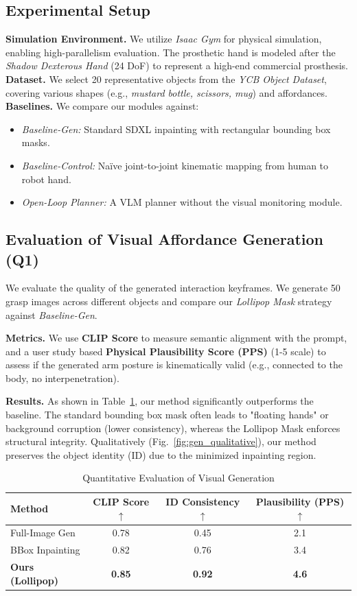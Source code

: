 \documentclass[letterpaper, 10 pt, conference]{ieeeconf}  %
\begin{document}
\subsection{Experimental Setup}
\textbf{Simulation Environment.} We utilize \textit{Isaac Gym} for physical simulation, enabling high-parallelism evaluation. The prosthetic hand is modeled after the \textit{Shadow Dexterous Hand} (24 DoF) to represent a high-end commercial prosthesis.
\textbf{Dataset.} We select 20 representative objects from the \textit{YCB Object Dataset}, covering various shapes (e.g., \textit{mustard bottle, scissors, mug}) and affordances.
\textbf{Baselines.} We compare our modules against:
\begin{itemize}
    \item \textit{Baseline-Gen:} Standard SDXL inpainting with rectangular bounding box masks.
    \item \textit{Baseline-Control:} Naïve joint-to-joint kinematic mapping from human to robot hand.
    \item \textit{Open-Loop Planner:} A VLM planner without the visual monitoring module.
\end{itemize}

\subsection{Evaluation of Visual Affordance Generation (Q1)}
\label{subsec:exp_generation}
We evaluate the quality of the generated interaction keyframes. We generate 50 grasp images across different objects and compare our \textit{Lollipop Mask} strategy against \textit{Baseline-Gen}.

\textbf{Metrics.} We use \textbf{CLIP Score} to measure semantic alignment with the prompt, and a user study based \textbf{Physical Plausibility Score (PPS)} (1-5 scale) to assess if the generated arm posture is kinematically valid (e.g., connected to the body, no interpenetration).

\textbf{Results.} As shown in Table~\ref{tab:gen_results}, our method significantly outperforms the baseline. The standard bounding box mask often leads to "floating hands" or background corruption (lower consistency), whereas the Lollipop Mask enforces structural integrity. Qualitatively (Fig.~\ref{fig:gen_qualitative}), our method preserves the object identity (ID) due to the minimized inpainting region.

\begin{table}[h]
\caption{Quantitative Evaluation of Visual Generation}
\label{tab:gen_results}
\centering
\begin{tabular}{lccc}
\hline
Method & CLIP Score $\uparrow$ & ID Consistency $\uparrow$ & Plausibility (PPS) $\uparrow$ \\
\hline
Full-Image Gen & 0.78 & 0.45 & 2.1 \\
BBox Inpainting & 0.82 & 0.76 & 3.4 \\
\textbf{Ours (Lollipop)} & \textbf{0.85} & \textbf{0.92} & \textbf{4.6} \\
\hline
\end{tabular}
\end{table}
\end{document}
